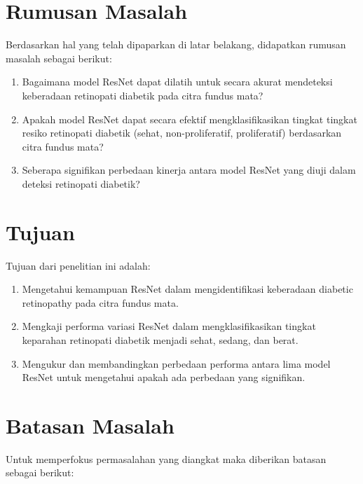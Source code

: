 \section{Rumusan Masalah}
\label{sec:permasalahan}

Berdasarkan hal yang telah dipaparkan di latar belakang, didapatkan rumusan masalah sebagai berikut:
\begin{enumerate}
	\item Bagaimana model ResNet dapat dilatih untuk secara akurat mendeteksi keberadaan retinopati diabetik pada citra fundus mata?
	\item Apakah model ResNet dapat secara efektif mengklasifikasikan tingkat tingkat resiko retinopati diabetik (sehat, non-proliferatif, proliferatif) berdasarkan citra fundus mata?
	\item Seberapa signifikan perbedaan kinerja antara model ResNet yang diuji dalam deteksi retinopati diabetik?
\end{enumerate}

\section{Tujuan}
\label{sec:Tujuan}

Tujuan dari penelitian ini adalah:
\begin{enumerate}
	\item Mengetahui kemampuan ResNet dalam mengidentifikasi keberadaan diabetic retinopathy pada citra fundus mata.
	\item Mengkaji performa variasi ResNet dalam mengklasifikasikan tingkat keparahan retinopati diabetik menjadi sehat, sedang, dan berat.
	\item Mengukur dan membandingkan perbedaan performa antara lima model ResNet untuk mengetahui apakah ada perbedaan yang signifikan.
\end{enumerate}

\section{Batasan Masalah}
\label{sec:batasanmasalah}

Untuk memperfokus permasalahan yang diangkat maka diberikan batasan sebagai berikut:

